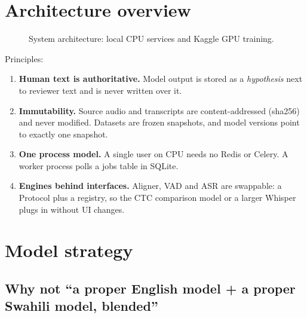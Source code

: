 \documentclass[11pt]{article}
\begin{document}
{\small\setlength{\parskip}{0pt}\setcounter{tocdepth}{1}\tableofcontents}
\bigskip
\hypertarget{architecture-overview}{%
\section{Architecture overview}\label{architecture-overview}}

\begin{figure}[!htbp]\centering
\resizebox{\ifdim\width>\linewidth\linewidth\else\width\fi}{!}{}
\caption{System architecture: local CPU services and Kaggle GPU training.}
\end{figure}

Principles:

\begin{enumerate}
\def\labelenumi{\arabic{enumi}.}
\tightlist
\item
  \textbf{Human text is authoritative.} Model output is stored as a \emph{hypothesis} next to reviewer text and is never written over it.
\item
  \textbf{Immutability.} Source audio and transcripts are content-addressed (sha256) and never modified. Datasets are frozen snapshots, and model versions point to exactly one snapshot.
\item
  \textbf{One process model.} A single user on CPU needs no Redis or Celery. A worker process polls a jobs table in SQLite.
\item
  \textbf{Engines behind interfaces.} Aligner, VAD and ASR are swappable: a Protocol plus a registry, so the CTC comparison model or a larger Whisper plugs in without UI changes.
\end{enumerate}

\hypertarget{model-strategy}{%
\section{Model strategy}\label{model-strategy}}

\hypertarget{why-not-a-proper-english-model--a-proper-swahili-model-blended}{%
\subsection{Why not ``a proper English model + a proper Swahili model, blended''}\label{why-not-a-proper-english-model--a-proper-swahili-model-blended}}
\end{document}

